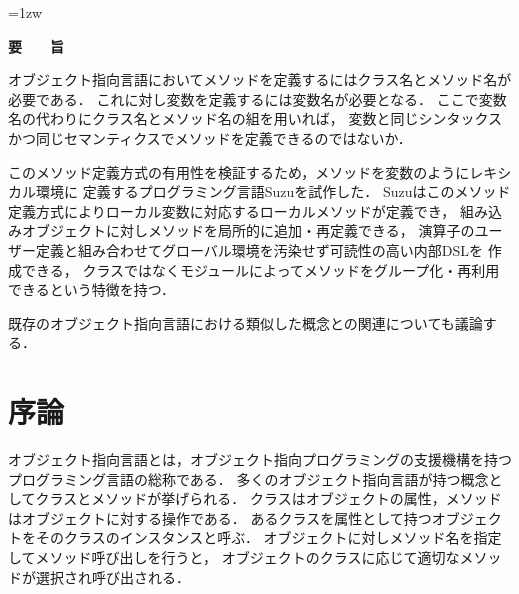 \documentclass[a4paper,11pt,dvipdfmx]{jreport}
\title{\Underline{レキシカル環境にメソッドを定義する\\オブジェクト指向言語Suzu}}
\author{林 拓人}
\begin{document}
\maketitle
\thispagestyle{empty}
\newpage

\thispagestyle{empty}
\vspace*{20pt plus 1fil}
\parindent=1zw
\noindent
\begin{center}
{\Large \bf 要　　旨}
\vspace{2cm}
\end{center}

オブジェクト指向言語においてメソッドを定義するにはクラス名とメソッド名が必要である．
これに対し変数を定義するには変数名が必要となる．
ここで変数名の代わりにクラス名とメソッド名の組を用いれば，
変数と同じシンタックスかつ同じセマンティクスでメソッドを定義できるのではないか．

このメソッド定義方式の有用性を検証するため，メソッドを変数のようにレキシカル環境に
定義するプログラミング言語Suzuを試作した．
Suzuはこのメソッド定義方式によりローカル変数に対応するローカルメソッドが定義でき，
組み込みオブジェクトに対しメソッドを局所的に追加・再定義できる，
演算子のユーザー定義と組み合わせてグローバル環境を汚染せず可読性の高い内部DSLを
作成できる，
クラスではなくモジュールによってメソッドをグループ化・再利用できるという特徴を持つ．

既存のオブジェクト指向言語における類似した概念との関連についても議論する．

\par
\vspace{0pt plus 1fil}
\newpage

\tableofcontents

\pagebreak \setcounter{page}{1}


\chapter{序論}

オブジェクト指向言語とは，オブジェクト指向プログラミングの支援機構を持つ
プログラミング言語の総称である．
多くのオブジェクト指向言語が持つ概念としてクラスとメソッドが挙げられる．
クラスはオブジェクトの属性，メソッドはオブジェクトに対する操作である．
あるクラスを属性として持つオブジェクトをそのクラスのインスタンスと呼ぶ．
オブジェクトに対しメソッド名を指定してメソッド呼び出しを行うと，
オブジェクトのクラスに応じて適切なメソッドが選択され呼び出される．
\end{document}
